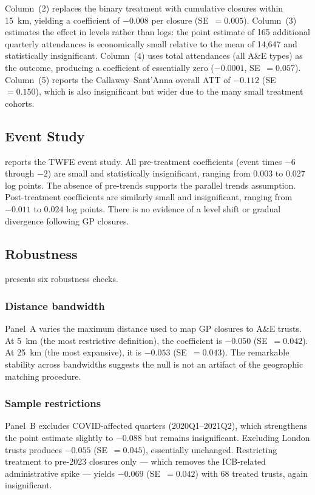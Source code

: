 \documentclass[12pt]{article}
\begin{document}
Column~(2) replaces the binary treatment with cumulative closures within 15~km, yielding a coefficient of $-0.008$ per closure (SE~$= 0.005$). Column~(3) estimates the effect in levels rather than logs: the point estimate of 165 additional quarterly attendances is economically small relative to the mean of 14,647 and statistically insignificant. Column~(4) uses total attendances (all A\&E types) as the outcome, producing a coefficient of essentially zero ($-0.0001$, SE~$= 0.057$). Column~(5) reports the Callaway--Sant'Anna overall ATT of $-0.112$ (SE~$= 0.150$), which is also insignificant but wider due to the many small treatment cohorts.



\subsection{Event Study}

 reports the TWFE event study. All pre-treatment coefficients (event times $-6$ through $-2$) are small and statistically insignificant, ranging from 0.003 to 0.027 log points. The absence of pre-trends supports the parallel trends assumption. Post-treatment coefficients are similarly small and insignificant, ranging from $-0.011$ to $0.024$ log points. There is no evidence of a level shift or gradual divergence following GP closures.



\subsection{Robustness}

 presents six robustness checks.

\subsubsection*{Distance bandwidth} Panel~A varies the maximum distance used to map GP closures to A\&E trusts. At 5~km (the most restrictive definition), the coefficient is $-0.050$ (SE~$= 0.042$). At 25~km (the most expansive), it is $-0.053$ (SE~$= 0.043$). The remarkable stability across bandwidths suggests the null is not an artifact of the geographic matching procedure.

\subsubsection*{Sample restrictions} Panel~B excludes COVID-affected quarters (2020Q1--2021Q2), which strengthens the point estimate slightly to $-0.088$ but remains insignificant. Excluding London trusts produces $-0.055$ (SE~$= 0.045$), essentially unchanged. Restricting treatment to pre-2023 closures only --- which removes the ICB-related administrative spike --- yields $-0.069$ (SE~$= 0.042$) with 68 treated trusts, again insignificant.
\end{document}
